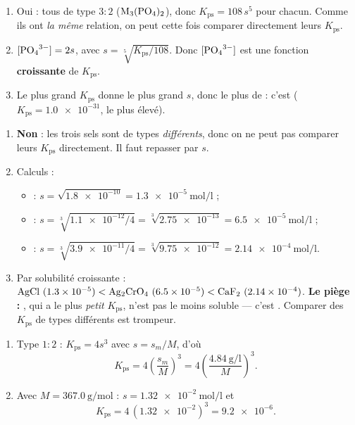 \documentclass[11pt,a4paper]{article}
\begin{document}
\begin{corrige}
\begin{enumerate}[label=\alph*)]
  \item Oui : tous de type $3{:}2$ ($\ce{M3(PO4)2}$), donc $K_{\mathrm{ps}}=108\,s^{5}$ pour chacun.
        Comme ils ont \emph{la même} relation, on peut cette fois comparer directement leurs
        $K_{\mathrm{ps}}$.
  \item $[\ce{PO4^{3-}}]=2s$, avec $s=\sqrt[5]{K_{\mathrm{ps}}/108}$. Donc $[\ce{PO4^{3-}}]$ est une
        fonction \textbf{croissante} de $K_{\mathrm{ps}}$.
  \item Le plus grand $K_{\mathrm{ps}}$ donne le plus grand $s$, donc le plus de  : c'est
        \textbf{} ($K_{\mathrm{ps}}=\num{1.0e-31}$, le plus élevé).
\end{enumerate}
\end{corrige}

\begin{corrige}
\begin{enumerate}[label=\alph*)]
  \item \textbf{Non} : les trois sels sont de types \emph{différents}, donc on ne peut pas comparer
        leurs $K_{\mathrm{ps}}$ directement. Il faut repasser par $s$.
  \item Calculs :
    \begin{itemize}[leftmargin=1.6em,topsep=1pt,itemsep=1pt]
      \item {} : $s=\sqrt{\num{1.8e-10}}=\qty{1.3e-5}{\mole\per\litre}$ ;
      \item {} : $s=\sqrt[3]{\num{1.1e-12}/4}=\sqrt[3]{\num{2.75e-13}}=\qty{6.5e-5}{\mole\per\litre}$ ;
      \item {} : $s=\sqrt[3]{\num{3.9e-11}/4}=\sqrt[3]{\num{9.75e-12}}=\qty{2.14e-4}{\mole\per\litre}$.
    \end{itemize}
  \item Par solubilité croissante :
    $\ce{AgCl}\ (\num{1.3e-5}) < \ce{Ag2CrO4}\ (\num{6.5e-5}) < \ce{CaF2}\ (\num{2.14e-4})$.
    \textbf{Le piège :} , qui a le plus \emph{petit} $K_{\mathrm{ps}}$, n'est pas le moins
    soluble — c'est . Comparer des $K_{\mathrm{ps}}$ de types différents est trompeur.
\end{enumerate}
\end{corrige}

\begin{corrige}
\begin{enumerate}[label=\alph*)]
  \item Type $1{:}2$ : $K_{\mathrm{ps}}=4s^{3}$ avec $s=s_m/M$, d'où
    \[ K_{\mathrm{ps}} = 4\left(\dfrac{s_m}{M}\right)^{3} = 4\left(\dfrac{\qty{4.84}{\gram\per\litre}}{M}\right)^{3}. \]
  \item Avec $M=\qty{367.0}{\gram\per\mole}$ : $s=\qty{1.32e-2}{\mole\per\litre}$ et
    \[ K_{\mathrm{ps}} = 4\,(\num{1.32e-2})^{3} = \num{9.2e-6}. \]
\end{enumerate}
\end{corrige}
\end{document}
